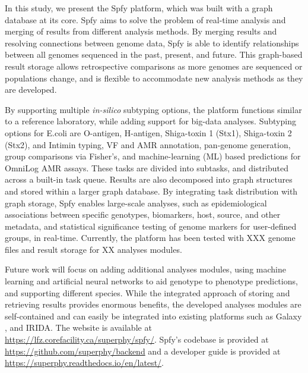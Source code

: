 \documentclass{article}
\begin{document}

In this study, we present the Spfy platform, which was built with a graph database at its core. Spfy aims to solve the problem of real-time analysis and merging of results from different analysis methods. By merging results and resolving connections between genome data, Spfy is able to identify relationships between all genomes sequenced in the past, present, and future. This graph-based result storage allows retrospective comparisons as more genomes are sequenced or populations change, and is flexible to accommodate new analysis methods as they are developed.


By supporting multiple \textit{in-silico} subtyping options, the platform functions similar to a reference laboratory, while adding support for big-data analyses. Subtyping options for E.coli are O-antigen, H-antigen, Shiga-toxin 1 (Stx1), Shiga-toxin 2 (Stx2), and Intimin typing, VF and AMR annotation, pan-genome generation, group comparisons via Fisher's, and machine-learning (ML) based predictions for OmniLog AMR assays. These tasks are divided into subtasks, and distributed across a built-in task queue. Results are also decomposed into graph structures and stored within a larger graph database. By integrating task distribution with graph storage, Spfy enables large-scale analyses, such as epidemiological associations between specific genotypes, biomarkers, host, source, and other metadata, and statistical significance testing of genome markers for user-defined groups, in real-time. Currently, the platform has been tested with XXX genome files and result storage for XX analyses modules.

Future work will focus on adding additional analyses modules, using machine learning and artificial neural networks to aid genotype to phenotype predictions, and supporting different species. While the integrated approach of storing and retrieving results provides enormous benefits, the developed analyses modules are self-contained and can easily be integrated into existing platforms such as Galaxy \cite{goecks2010galaxy}, and IRIDA. The website is available at \url{https://lfz.corefacility.ca/superphy/spfy/}. Spfy's codebase is provided at \url{https://github.com/superphy/backend} and a developer guide is provided at \url{https://superphy.readthedocs.io/en/latest/}.
\end{document}

